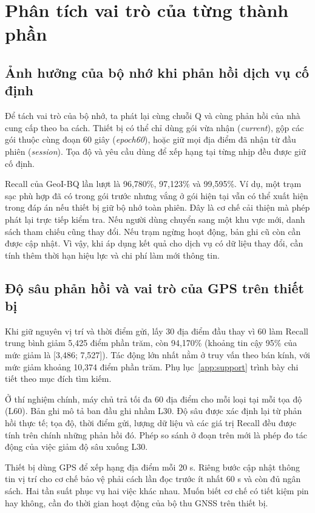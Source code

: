\section{Phân tích vai trò của từng thành phần}
\subsection{Ảnh hưởng của bộ nhớ khi phản hồi dịch vụ cố định}
Để tách vai trò của bộ nhớ, ta phát lại cùng chuỗi Q và cùng phản hồi của nhà cung cấp theo
ba cách. Thiết bị có thể chỉ dùng gói vừa nhận (\emph{current}), gộp các gói thuộc cùng đoạn
60 giây (\emph{epoch60}), hoặc giữ mọi địa điểm đã nhận từ đầu phiên (\emph{session}). Tọa độ
và yêu cầu dùng để xếp hạng tại từng nhịp đều được giữ cố định.


Recall của GeoI-BQ lần lượt là 96,780\%, 97,123\% và 99,595\%. Ví dụ, một trạm sạc phù hợp
đã có trong gói trước nhưng vắng ở gói hiện tại vẫn có thể xuất hiện trong đáp án nếu thiết bị
giữ bộ nhớ toàn phiên. Đây là cơ chế cải thiện mà phép phát lại trực tiếp kiểm tra. Nếu người
dùng chuyển sang một khu vực mới, danh sách tham chiếu cũng thay đổi. Nếu trạm ngừng hoạt động,
bản ghi cũ còn cần được cập nhật. Vì vậy, khi áp dụng kết quả cho dịch vụ có dữ liệu thay đổi,
cần tính thêm thời hạn hiệu lực và chi phí làm mới thông tin.

\subsection{Độ sâu phản hồi và vai trò của GPS trên thiết bị}
Khi giữ nguyên vị trí và thời điểm gửi, lấy 30 địa điểm đầu thay vì 60 làm Recall trung bình giảm 5,425 điểm phần trăm, còn 94,170\% (khoảng tin cậy 95\% của mức giảm là [3,486; 7,527]). Tác động lớn nhất nằm ở truy vấn theo bán kính, với mức giảm khoảng 10,374 điểm phần trăm. Phụ lục~\ref{app:support} trình bày chi tiết theo mục đích tìm kiếm.

Ở thí nghiệm chính, máy chủ trả tối đa 60 địa điểm cho mỗi loại tại mỗi tọa độ (L60). Bản ghi mô tả ban đầu ghi nhầm L30. Độ sâu được xác định lại từ phản hồi thực tế; tọa độ, thời điểm gửi, lượng dữ liệu và các giá trị Recall đều được tính trên chính những phản hồi đó. Phép so sánh ở đoạn trên mới là phép đo tác động của việc giảm độ sâu xuống L30.

Thiết bị dùng GPS để xếp hạng địa điểm mỗi 20 s. Riêng bước cập nhật thông tin vị trí cho cơ chế bảo vệ phải cách lần đọc trước ít nhất 60 s và còn đủ ngân sách. Hai tần suất phục vụ hai việc khác nhau. Muốn biết cơ chế có tiết kiệm pin hay không, cần đo thời gian hoạt động của bộ thu GNSS trên thiết bị.

